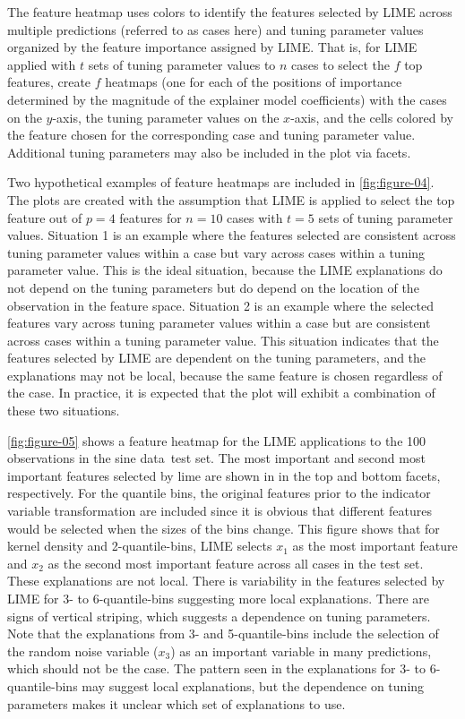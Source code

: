 \documentclass[AMS,STIX2COL]{WileyNJD-v2}\usepackage[]{graphicx}\usepackage[]{color}
\newcommand{\data}{sine data}
\begin{document}
The feature heatmap uses colors to identify the features selected by LIME across multiple predictions (referred to as cases here) and tuning parameter values organized by the  feature importance assigned by LIME. That is, for LIME applied with $t$ sets of tuning parameter values to $n$ cases to select the $f$ top features, create $f$ heatmaps (one for each of the positions of importance determined by the magnitude of the explainer model coefficients) with the cases on the $y$-axis, the tuning parameter values on the $x$-axis, and the cells colored by the feature chosen for the corresponding case and tuning parameter value. Additional tuning parameters may also be included in the plot via facets.

Two hypothetical examples of feature heatmaps are included in \autoref{fig:figure-04}. The plots are created with the assumption that LIME is applied to select the top feature out of $p=4$  features for $n=10$ cases with $t=5$ sets of tuning parameter values. Situation 1 is  an example where the features selected are consistent across tuning parameter values within a case but vary across cases within a tuning parameter value. This is the ideal situation, because the LIME explanations do not depend on the tuning parameters but do depend on the location of the observation in the feature space. Situation 2 is an example where the selected features vary across tuning parameter values within a case but are consistent across cases within a tuning parameter value. This situation indicates that the features selected by LIME are dependent on the tuning parameters, and the explanations may not be  local, because the same feature is chosen regardless of the case. In practice, it is expected that the plot will exhibit a combination of these two situations.

\autoref{fig:figure-05} shows a feature heatmap for the LIME applications to the 100 observations in the \data \ test set. The most important and second most important features selected by lime are shown in in the top and bottom facets, respectively. For the quantile bins, the original features prior to the indicator variable transformation are included since it is obvious that different features would be selected when the sizes of the bins change. This figure shows that for kernel density and 2-quantile-bins, LIME selects $x_1$ as the most important feature and $x_2$ as the second most important feature across all cases in the test set. These explanations are not local. There is variability in the features selected by LIME for 3- to 6-quantile-bins suggesting more local explanations. There are signs of vertical striping, which suggests a dependence on tuning parameters. Note that the explanations from 3- and 5-quantile-bins include the selection of the random noise variable ($x_3$) as an important variable in many predictions, which should not be the case. The pattern seen in the explanations for 3- to 6-quantile-bins may suggest local explanations, but the dependence on tuning parameters makes it unclear which set of explanations to use.
\end{document}
